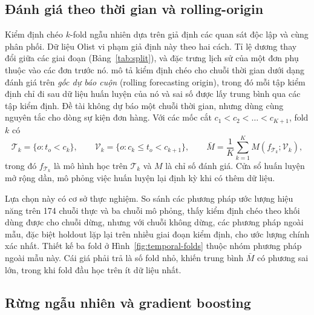 \documentclass[12pt,a4paper]{report}
\begin{document}
\subsection{Đánh giá theo thời gian và rolling-origin}\label{sec:th-temporal}

Kiểm định chéo $k$-fold ngẫu nhiên dựa trên giả định các quan sát độc lập và cùng phân phối. Dữ liệu Olist vi phạm giả định này theo hai cách. Tỉ lệ dương thay đổi giữa các giai đoạn (Bảng~\ref{tab:split}), và đặc trưng lịch sử của một đơn phụ thuộc vào các đơn trước nó. \textcite{hyndman2021} mô tả kiểm định chéo cho chuỗi thời gian dưới dạng đánh giá trên \emph{gốc dự báo cuộn} (rolling forecasting origin), trong đó mỗi tập kiểm định chỉ đi sau dữ liệu huấn luyện của nó và sai số được lấy trung bình qua các tập kiểm định. Đề tài không dự báo một chuỗi thời gian, nhưng dùng cùng nguyên tắc cho dòng sự kiện đơn hàng. Với các mốc cắt $c_1 < c_2 < \dots < c_{K+1}$, fold $k$ có
\begin{equation}\label{eq:th-rolling}
  \mathcal{T}_k = \{ o : t_o < c_k \}, \qquad
  \mathcal{V}_k = \{ o : c_k \le t_o < c_{k+1} \}, \qquad
  \bar{M} = \frac{1}{K} \sum_{k=1}^{K} M\!\left(f_{\mathcal{T}_k}; \mathcal{V}_k\right),
\end{equation}
trong đó $f_{\mathcal{T}_k}$ là mô hình học trên $\mathcal{T}_k$ và $M$ là chỉ số đánh giá. Cửa sổ huấn luyện mở rộng dần, mô phỏng việc huấn luyện lại định kỳ khi có thêm dữ liệu.

Lựa chọn này có cơ sở thực nghiệm. So sánh các phương pháp ước lượng hiệu năng trên 174 chuỗi thực và ba chuỗi mô phỏng, \textcite{cerqueira2020} thấy kiểm định chéo theo khối dùng được cho chuỗi dừng, nhưng với chuỗi không dừng, các phương pháp ngoài mẫu, đặc biệt holdout lặp lại trên nhiều giai đoạn kiểm định, cho ước lượng chính xác nhất. Thiết kế ba fold ở Hình~\ref{fig:temporal-folds} thuộc nhóm phương pháp ngoài mẫu này. Cái giá phải trả là số fold nhỏ, khiến trung bình $\bar M$ có phương sai lớn, trong khi fold đầu học trên ít dữ liệu nhất.

\subsection{Rừng ngẫu nhiên và gradient boosting}\label{sec:th-trees}
\end{document}
